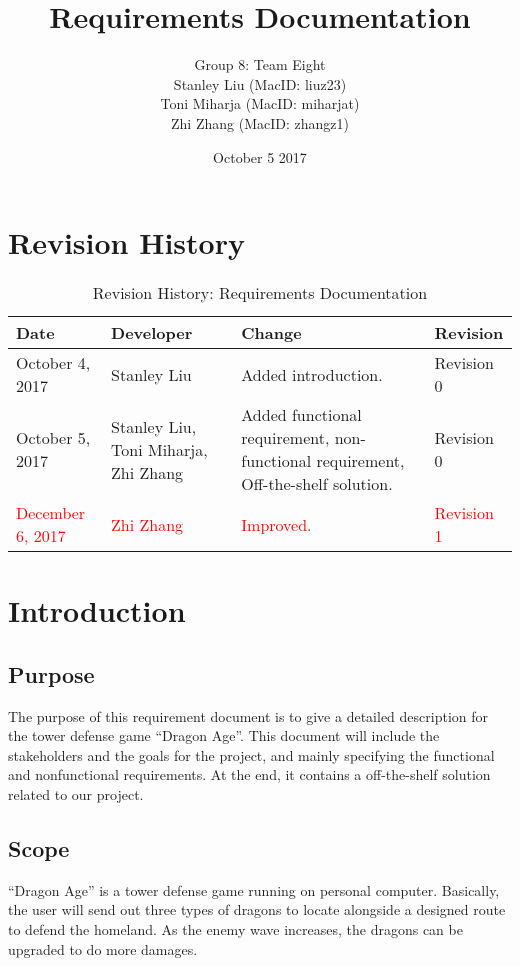 \documentclass{article}
\title{Requirements Documentation}
\author{Group 8: Team Eight \\
                 Stanley Liu (MacID: liuz23) \\    
                 Toni Miharja (MacID: miharjat)\\
                 Zhi Zhang (MacID: zhangz1)}
\date{October 5 2017 }
\begin{document}
 
\maketitle
\newpage
\tableofcontents
\newpage
 
\section{Revision History}
\begin{table}[h!]
    \centering
    \begin{tabular}{|p{2.5cm}|p{3cm}|p{3cm}|p{2cm}|}
    \hline
    \textbf {Date}  & {Developer} & {Change} & {Revision} \\
    \hline
    October 4, 2017 & Stanley Liu & Added introduction. & Revision 0\\
    \hline
    October 5, 2017  & Stanley Liu, Toni Miharja, Zhi Zhang & Added functional requirement, non-functional requirement, Off-the-shelf solution. & Revision 0\\
    \hline
    \textcolor{red}{December 6, 2017} & \textcolor{red}{Zhi Zhang} & \textcolor{red}{Improved.} & \textcolor{red}{Revision 1}\\
    \hline
    \end{tabular}
    \caption{Revision History: Requirements Documentation}
\end{table}
 
\newpage
 
\section{Introduction}

\subsection{Purpose}
The purpose of this requirement document is to give a detailed description for the tower defense game “Dragon Age”. This document will include the stakeholders and the goals for the project, and mainly specifying the functional and nonfunctional requirements. At the end, it contains a off-the-shelf solution related to our project.

\subsection{Scope}
“Dragon Age” is a tower defense game running on personal computer. Basically, the user will send out three types of dragons to locate alongside a designed route to defend the homeland. As the enemy wave increases, the dragons can be upgraded to do more damages.
\end{document}
